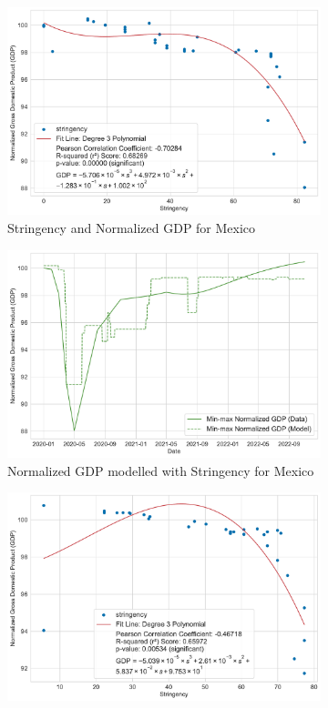 \documentclass[tikz,fleqn,12pt]{wlscirep}
\begin{document}
\begin{figure}[htbp!]
\begin{subfigure}[t]{0.48\textwidth}
    \includegraphics[width=\linewidth]{images/stringency_vs_gdp_MEX.pdf}
    \caption{Stringency and Normalized GDP for Mexico}
    \label{fig:stringency_vs_gdp_MEX}
  \end{subfigure}
  \hfill
  \begin{subfigure}[t]{0.48\textwidth}
    \centering
    \includegraphics[width=\linewidth]{images/gdp_modelled_with_stringency_MEX.pdf}
    \caption{Normalized GDP modelled with Stringency for Mexico}
    \label{fig:gdp_modelled_with_stringency_MEX}
  \end{subfigure}
  \begin{subfigure}[t]{0.48\textwidth}
    \centering
    \includegraphics[width=\linewidth]{images/stringency_vs_gdp_BRA.pdf}

\end{subfigure}
\end{figure}
\end{document}
